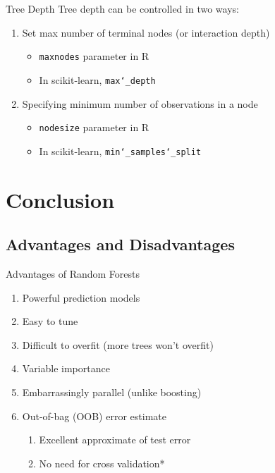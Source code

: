 \documentclass[pdf]{beamer}
\begin{document}
		\begin{frame}{Tree Depth}
			Tree depth can be controlled in two ways:
			\vspace{5 mm}
			\begin{enumerate}
				\item{Set max number of terminal nodes (or interaction depth)}
					\begin{itemize}
						\item{\texttt{maxnodes} parameter in R}
						\item In scikit-learn, \texttt{max\char`_depth} 
					\end{itemize}
				
				\item{Specifying minimum number of observations in a node}
					\begin{itemize}
						\item{\texttt{nodesize} parameter in R}
						\item{In scikit-learn,  \texttt{min\char`_samples\char`_split}}
					\end{itemize}
			\end{enumerate}
		\end{frame}
	
	
		
\section{Conclusion}	
	
	\subsection{Advantages and Disadvantages}
		\begin{frame}{Advantages of Random Forests}
			\begin{enumerate}
				\item Powerful prediction models
				\item Easy to tune
				\item Difficult to overfit (more trees won't overfit)
				\item Variable importance
				\item Embarrassingly parallel (unlike boosting)
				\item Out-of-bag (OOB) error estimate
					\begin{enumerate}[1]
						\item Excellent approximate of test error
						\item No need for cross validation*
					\end{enumerate}

			\end{enumerate}
		\end{frame}
\end{document}
